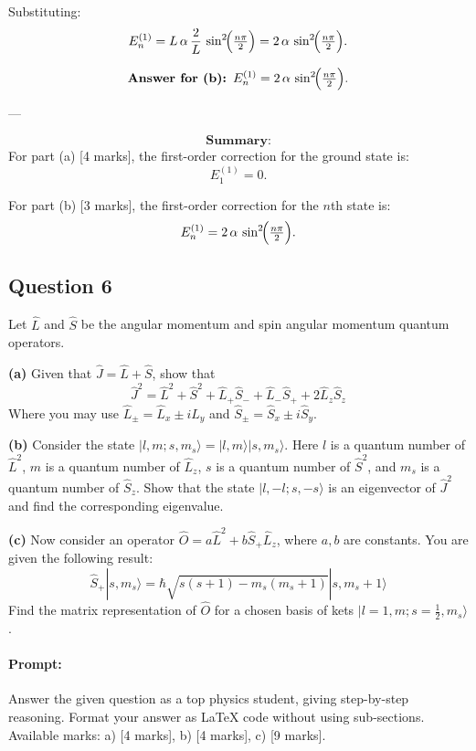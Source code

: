 \documentclass{article}
\begin{document}
Substituting:
\[
E_n^{(1)} = L\,\alpha \,\frac{2}{L}\,\sin^2\!\Bigl(\tfrac{n\pi}{2}\Bigr)
= 2\,\alpha\,\sin^2\!\Bigl(\tfrac{n\pi}{2}\Bigr).
\]

\[
\textbf{Answer for (b): } E_n^{(1)} = 2\,\alpha\,\sin^2\!\Bigl(\tfrac{n\pi}{2}\Bigr).
\]

---

\[
\textbf{Summary:}
\]
For part (a) [4 marks], the first-order correction for the ground state is:
\[
E_1^{(1)} = 0.
\]

For part (b) [3 marks], the first-order correction for the \(n\)th state is:
\[
E_n^{(1)} = 2\,\alpha\,\sin^2\!\Bigl(\tfrac{n\pi}{2}\Bigr).
\]


\subsection{Question 6}

Let \(\hat{L}\) and \(\hat{S}\) be the angular momentum and spin angular momentum quantum operators.

\textbf{(a)} Given that \(\hat{J} = \hat{L} + \hat{S}\), show that
\[
\hat{J}^2 = \hat{L}^2 + \hat{S}^2 + \hat{L}_+ \hat{S}_- + \hat{L}_- \hat{S}_+ + 2 \hat{L}_z \hat{S}_z
\]
Where you may use \(\hat{L}_\pm = \hat{L}_x \pm i \hat{L}_y\) and \(\hat{S}_\pm = \hat{S}_x \pm i \hat{S}_y\).

\textbf{(b)} Consider the state \(|l, m; s, m_s\rangle = |l, m\rangle |s, m_s\rangle\). Here \(l\) is a quantum number of \(\hat{L}^2\), \(m\) is a quantum number of \(\hat{L}_z\), \(s\) is a quantum number of \(\hat{S}^2\), and \(m_s\) is a quantum number of \(\hat{S}_z\). Show that the state \(|l, -l; s, -s\rangle\) is an eigenvector of \(\hat{J}^2\) and find the corresponding eigenvalue.

\textbf{(c)} Now consider an operator \(\hat{O} = a \hat{L}^2 + b \hat{S}_+ \hat{L}_z\), where \(a, b\) are constants. You are given the following result:
\[
\hat{S}_+ |s, m_s\rangle = \hbar \sqrt{s(s+1) - m_s(m_s + 1)} |s, m_s + 1\rangle
\]
Find the matrix representation of \(\hat{O}\) for a chosen basis of kets \(|l = 1, m; s = \frac{1}{2}, m_s\rangle\).

\paragraph{Prompt: \\} 
Answer the given question as a top physics student, giving step-by-step reasoning. Format your answer as LaTeX code without using sub-sections. Available marks: a) [4 marks], b) [4 marks], c) [9 marks].
\end{document}

